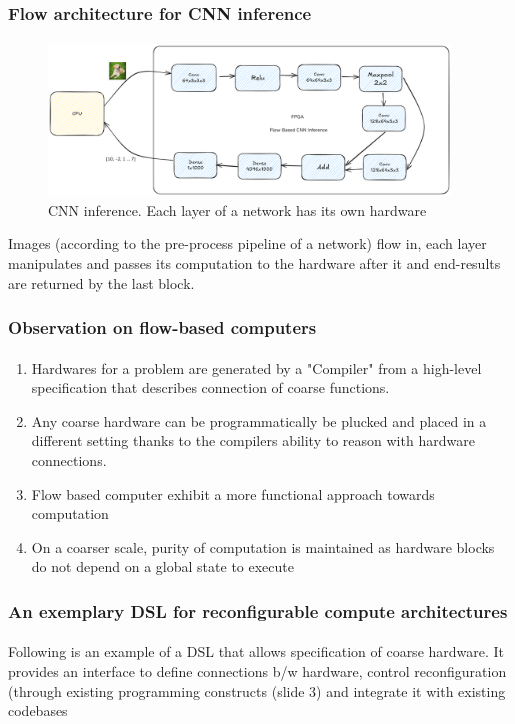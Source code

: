 \documentclass{beamer}
\begin{document}
\begin{frame}[fragile]
  \frametitle{Flow architecture for CNN inference}
  \framesubtitle{}
  \begin{figure}
    \centering
    \includegraphics[width=0.95\textwidth]{flowcnn.png}
    \caption{CNN inference. Each layer of a network has its own hardware}
    \label{}
  \end{figure}

  Images (according to the pre-process pipeline of a network) flow
  in, each layer manipulates and passes its computation to the
  hardware after it and end-results are returned by the last
  block.
\end{frame}

\begin{frame}[fragile]
  \frametitle{Observation on flow-based computers}
  \framesubtitle{}
  \begin{enumerate}
      
    \item Hardwares for a problem are generated by a "Compiler" from a high-level
      specification that describes connection of coarse functions.
    \item Any coarse hardware can be programmatically be plucked and placed in a
      different setting thanks to the compilers ability to reason with hardware
      connections.
    \item Flow based computer exhibit a more functional approach towards
      computation
    \item On a coarser scale, purity of computation is maintained as hardware
      blocks do not depend on a global state to execute
  \end{enumerate}
\end{frame}

\begin{frame}[fragile]
  \frametitle{An exemplary DSL for reconfigurable compute architectures}
\framesubtitle{}
  Following is an example of a DSL that allows specification of coarse hardware.
  It provides an interface to define connections b/w hardware, control
  reconfiguration (through existing programming constructs (slide 3) and
  integrate it with existing codebases

\end{frame}
\end{document}
